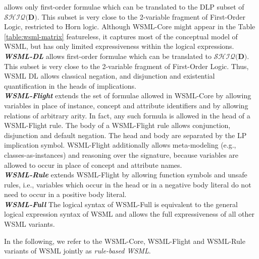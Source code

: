   allows only first-order
formulae which can be translated to the DLP subset of
$\mathcal{SHIQ}(\mathbf{D)}$. This subset is very
close to the 2-variable fragment of First-Order Logic, restricted
to Horn logic. Although WSML-Core might appear in the Table
\ref{table:wsml-matrix} featureless, it captures most of the
conceptual model of WSML, but has only limited expressiveness
within the logical expressions.
\\
{\sl \bfseries WSML-DL} allows first-order formulae which can be
translated to $\mathcal{SHIQ}(\mathbf{D)}$. This subset is very
close to the 2-variable fragment of First-Order Logic. Thus, WSML
DL allows classical negation, and disjunction and existential
quantification in the heads of implications.
\\
{\sl \bfseries WSML-Flight} extends the set of formulae allowed
in WSML-Core by allowing variables in place of instance, concept
and attribute identifiers and by allowing relations of arbitrary
arity. In fact, any such formula is allowed in the head of a
WSML-Flight rule. The body of a WSML-Flight rule allows
conjunction, disjunction and default negation. The head and body
are separated by the LP implication symbol. WSML-Flight
additionally allows meta-modeling (e.g., classes-as-instances) and
 reasoning over the signature, because variables are allowed to
occur in place of concept and attribute names.
\\
{\sl \bfseries WSML-Rule} extends WSML-Flight by allowing
function symbols and unsafe rules, i.e., variables which occur in
the head or in a negative body literal do not need to occur in a
positive body literal.
\\
{\sl \bfseries WSML-Full} The logical syntax of WSML-Full is
equivalent to the general logical expression syntax of WSML and
allows the full expressiveness of all other WSML variants.

In the following, we refer to the WSML-Core, WSML-Flight and
WSML-Rule variants of WSML jointly as \emph{rule-based WSML}.

